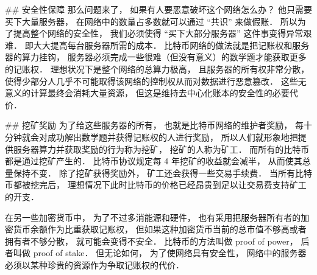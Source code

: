 ## 安全性保障
那么问题来了， 如果有人要恶意破坏这个网络怎么办？ 他只需要买下大量服务器， 在网络中的数量占多数就可以通过 “共识” 来做假账． 所以为了提高整个网络的安全性， 我们必须使得 “买下大部分服务器” 这件事变得异常艰难． 即大大提高每台服务器所需的成本． 比特币网络的做法就是把记账权和服务器的算力挂钩， 服务器必须完成一些很难（但没有意义）的数学题才能获取更多的记账权． 理想状况下是整个网络的总算力极高， 且服务器的所有权非常分散， 使得少部分人几乎不可能取得该网络的控制权从而对数据进行恶意篡改． 这些无意义的计算最终会消耗大量资源， 但这是维持去中心化账本的安全性的必要代价．

## 挖矿奖励
为了给这些服务器的所有， 也就是比特币网络的维护者奖励， 每十分钟就会对成功解出数学题并获得记账权的人进行奖励， 所以人们就形象地把提供服务器算力并获取奖励的行为称为挖矿， 挖矿的人称为矿工． 而所有的比特币都是通过挖矿产生的． 比特币协议规定每 4 年挖矿的收益就会减半， 从而使其总量保持不变． 除了挖矿获得奖励外， 矿工还会获得一些交易手续费． 当所有比特币都被挖完后， 理想情况下此时比特币的价格已经昂贵到足以让交易费支持矿工的开支．

在另一些加密货币中， 为了不过多消能源和硬件， 也有采用把服务器所有者的加密货币余额作为比重获取记账权， 但如果这种加密货币当前的总市值不够高或者拥有者不够分散， 就可能会变得不安全． 比特币的方法叫做 proof of power， 后者叫做 proof of stake． 但无论如何， 为了使网络具有安全性， 网络中的服务器必须以某种珍贵的资源作为争取记账权的代价．
